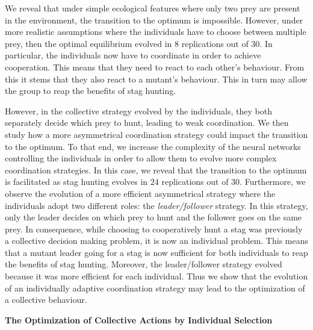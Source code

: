We reveal that under simple ecological features where only two prey are present in the environment, the transition to the optimum is impossible. However, under more realistic assumptions where the individuals have to choose between multiple prey, then the optimal equilibrium evolved in $8$ replications out of $30$. In particular, the individuals now have to coordinate in order to achieve cooperation. This means that they need to react to each other's behaviour. From this it stems that they also react to a mutant's behaviour. This in turn may allow the group to reap the benefits of stag hunting. 

However, in the collective strategy evolved by the individuals, they both separately decide which prey to hunt, leading to weak coordination. We then study how a more asymmetrical coordination strategy could impact the transition to the optimum. To that end, we increase the complexity of the neural networks controlling the individuals in order to allow them to evolve more complex coordination strategies. In this case, we reveal that the transition to the optimum is facilitated as stag hunting evolves in $24$ replications out of $30$. Furthermore, we observe the evolution of a more efficient asymmetrical strategy where the individuals adopt two different roles: the \emph{leader/follower} strategy. In this strategy, only the leader decides on which prey to hunt and the follower goes on the same prey. In consequence, while choosing to cooperatively hunt a stag was previously a collective decision making problem, it is now an individual problem. This means that a mutant leader going for a stag is now sufficient for both individuals to reap the benefits of stag hunting. Moreover, the leader/follower strategy evolved because it was more efficient for each individual. Thus we show that the evolution of an individually adaptive coordination strategy may lead to the optimization of a collective behaviour.

\clearpage

\begin{flushleft}
\textbf{\Huge The Optimization of Collective Actions by Individual Selection}
\end{flushleft}

